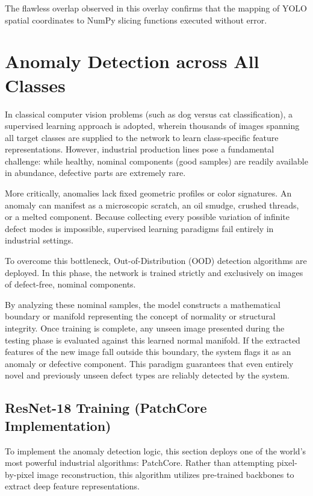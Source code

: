 \documentclass{article}
\begin{document}
The flawless overlap observed in this overlay confirms that the mapping of YOLO spatial coordinates to NumPy slicing functions executed without error.

\section{Anomaly Detection across All Classes}

In classical computer vision problems (such as dog versus cat classification), a supervised learning approach is adopted, wherein thousands of images spanning all target classes are supplied to the network to learn class-specific feature representations. However, industrial production lines pose a fundamental challenge: while healthy, nominal components (good samples) are readily available in abundance, defective parts are extremely rare.

More critically, anomalies lack fixed geometric profiles or color signatures. An anomaly can manifest as a microscopic scratch, an oil smudge, crushed threads, or a melted component. Because collecting every possible variation of infinite defect modes is impossible, supervised learning paradigms fail entirely in industrial settings.

To overcome this bottleneck, Out-of-Distribution (OOD) detection algorithms are deployed. In this phase, the network is trained strictly and exclusively on images of defect-free, nominal components.

By analyzing these nominal samples, the model constructs a mathematical boundary or manifold representing the concept of normality or structural integrity. Once training is complete, any unseen image presented during the testing phase is evaluated against this learned normal manifold. If the extracted features of the new image fall outside this boundary, the system flags it as an anomaly or defective component. This paradigm guarantees that even entirely novel and previously unseen defect types are reliably detected by the system.


\subsection{ResNet-18 Training (PatchCore Implementation)}

To implement the anomaly detection logic, this section deploys one of the world's most powerful industrial algorithms: PatchCore. Rather than attempting pixel-by-pixel image reconstruction, this algorithm utilizes pre-trained backbones to extract deep feature representations.
\end{document}
